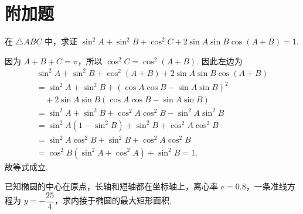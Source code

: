 \section{附加题}

\begin{problem}
在 \(\triangle ABC\) 中，求证 \(\sin^2 A+\sin^2 B+\cos^2 C+2\sin A\sin B\cos\left(A+B\right)=1\).
\end{problem}

\begin{solution}
因为 \(A+B+C=\pi\)，所以 \(\cos^2C=\cos^2\left(A+B\right)\). 因此左边为
\[
\begin{gathered}
\sin^2A+\sin^2B+\cos^2\left(A+B\right)+2\sin A\sin B\cos\left(A+B\right)\\
=\sin^2A+\sin^2B+\left(\cos A\cos B-\sin A\sin B\right)^2\\
\quad+2\sin A\sin B\left(\cos A\cos B-\sin A\sin B\right)\\
=\sin^2A+\sin^2B+\cos^2A\cos^2B-\sin^2A\sin^2B\\
=\sin^2A\left(1-\sin^2B\right)+\sin^2B+\cos^2A\cos^2B\\
=\sin^2A\cos^2B+\sin^2B+\cos^2A\cos^2B\\
=\cos^2B\left(\sin^2A+\cos^2A\right)+\sin^2B=1.
\end{gathered}
\]
故等式成立.
\end{solution}

\begin{problem}
已知椭圆的中心在原点，长轴和短轴都在坐标轴上，离心率 \(e=0.8\)，一条准线方程为 \(y=-\dfrac{25}{4}\)，求内接于椭圆的最大矩形面积.
\end{problem}

